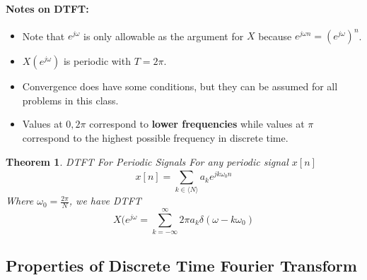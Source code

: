 \documentclass[a4paper,12pt]{report}
\newtheorem{theorem}{Theorem}
\begin{document}
\paragraph{Notes on DTFT: } 
\begin{itemize}
\item Note that $e^{j\omega}$ is only allowable as the argument for $X$ because $e^{j\omega n} = (e^{j\omega})^n$.
\item $X(e^{j\omega})$ is periodic with $T=2\pi$.
\item Convergence does have some conditions, but they can be assumed for all problems in this class. 
\item Values at $0, 2\pi$ correspond to \textbf{lower frequencies} while values at $\pi$ correspond to the highest possible frequency in discrete time. 
\end{itemize}

\begin{theorem}{DTFT For Periodic Signals}
For any periodic signal $x[n]$ \begin{equation}
x[n] = \sum_{k\in \langle N \rangle}^{} a_k e^{jk\omega_0 n}
\end{equation}
Where $\omega_0 = \frac{2\pi}{N}$, we have DTFT 
\begin{equation}
X(e^{j\omega} = \sum_{k = -\infty}^{\infty} 2\pi a_k \delta(\omega-k\omega_0)
\end{equation}
\end{theorem}


\subsection{Properties of Discrete Time Fourier Transform}
\end{document}
